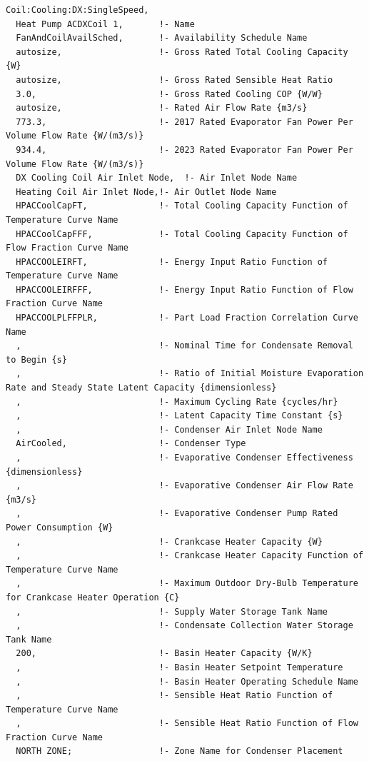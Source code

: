 \begin{lstlisting}
Coil:Cooling:DX:SingleSpeed,
  Heat Pump ACDXCoil 1,       !- Name
  FanAndCoilAvailSched,       !- Availability Schedule Name
  autosize,                   !- Gross Rated Total Cooling Capacity {W}
  autosize,                   !- Gross Rated Sensible Heat Ratio
  3.0,                        !- Gross Rated Cooling COP {W/W}
  autosize,                   !- Rated Air Flow Rate {m3/s}
  773.3,                      !- 2017 Rated Evaporator Fan Power Per Volume Flow Rate {W/(m3/s)}
  934.4,                      !- 2023 Rated Evaporator Fan Power Per Volume Flow Rate {W/(m3/s)}
  DX Cooling Coil Air Inlet Node,  !- Air Inlet Node Name
  Heating Coil Air Inlet Node,!- Air Outlet Node Name
  HPACCoolCapFT,              !- Total Cooling Capacity Function of Temperature Curve Name
  HPACCoolCapFFF,             !- Total Cooling Capacity Function of Flow Fraction Curve Name
  HPACCOOLEIRFT,              !- Energy Input Ratio Function of Temperature Curve Name
  HPACCOOLEIRFFF,             !- Energy Input Ratio Function of Flow Fraction Curve Name
  HPACCOOLPLFFPLR,            !- Part Load Fraction Correlation Curve Name
  ,                           !- Nominal Time for Condensate Removal to Begin {s}
  ,                           !- Ratio of Initial Moisture Evaporation Rate and Steady State Latent Capacity {dimensionless}
  ,                           !- Maximum Cycling Rate {cycles/hr}
  ,                           !- Latent Capacity Time Constant {s}
  ,                           !- Condenser Air Inlet Node Name
  AirCooled,                  !- Condenser Type
  ,                           !- Evaporative Condenser Effectiveness {dimensionless}
  ,                           !- Evaporative Condenser Air Flow Rate {m3/s}
  ,                           !- Evaporative Condenser Pump Rated Power Consumption {W}
  ,                           !- Crankcase Heater Capacity {W}
  ,                           !- Crankcase Heater Capacity Function of Temperature Curve Name
  ,                           !- Maximum Outdoor Dry-Bulb Temperature for Crankcase Heater Operation {C}
  ,                           !- Supply Water Storage Tank Name
  ,                           !- Condensate Collection Water Storage Tank Name
  200,                        !- Basin Heater Capacity {W/K}
  ,                           !- Basin Heater Setpoint Temperature
  ,                           !- Basin Heater Operating Schedule Name
  ,                           !- Sensible Heat Ratio Function of Temperature Curve Name
  ,                           !- Sensible Heat Ratio Function of Flow Fraction Curve Name
  NORTH ZONE;                 !- Zone Name for Condenser Placement
\end{lstlisting}

